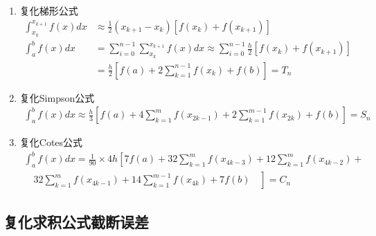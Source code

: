 \documentclass[12pt]{report}
\begin{document}
\begin{enumerate}
	\item 复化梯形公式
	\begin{equation} \tag{3.8} \label{3.8}
		\begin{aligned}
			\int_{x_k}^{x_{k+1}} f(x) dx &\approx \frac{1}{2}(x_{k+1} - x_k)\left[f(x_k) + f(x_{k+1})\right]\\
			\int_{a}^{b} f(x) dx &= \sum_{i=0}^{n-1} \sum_{x_k}^{x_{k+1}} f(x) dx \approx \sum_{i=0}^{n-1} \frac{h}{2}\left[f(x_k) + f(x_{k+1})\right]  \\
			&=\frac{h}{2} \left[f(a) + 2\sum_{k=1}^{n-1} f(x_k) +f(b) \right] = T_n
		\end{aligned}
	\end{equation}

	\item 复化Simpson公式
	\begin{equation} \tag{3.9} \label{3.9}
		\begin{aligned}
			\int_{a}^{b} f(x) dx \approx \frac{h}{3} \left[f(a) + 4\sum_{k=1}^{m} f(x_{2k-1}) + 2\sum_{k=1}^{m-1}f(x_{2k}) +f(b)\right] = S_n
		\end{aligned}
	\end{equation}

	\item 复化Cotes公式
	\begin{equation} \tag{3.10} \label{3.10}
		\begin{aligned}
			\int_{a}^{b} f(x) dx=\frac{1}{90} \times 4 h\left[7 f(a)+32 \sum_{k=1}^{m} f\left(x_{4 k-3}\right)+12 \sum_{k=1}^{m} f\left(x_{4 k-2}\right)+\right. \\
			\left.\quad 32 \sum_{k=1}^{m} f\left(x_{4 k-1}\right)+14 \sum_{k=1}^{m-1} f\left(x_{4 k}\right)+7 f(b) \quad\right]=C_{n}
		\end{aligned}
	\end{equation}
\end{enumerate}

\subsection{复化求积公式截断误差}
\end{document}
